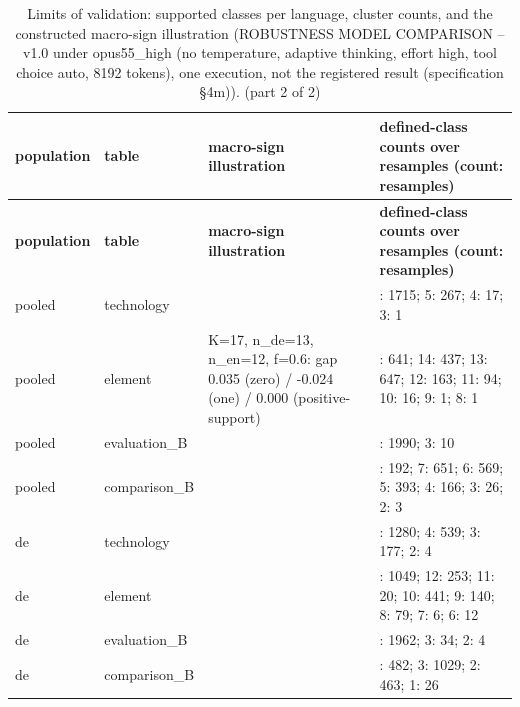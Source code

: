 \begingroup\footnotesize
\begin{longtable}{>{\raggedright\arraybackslash}p{67.2pt}>{\raggedright\arraybackslash}p{61.3pt}>{\raggedright\arraybackslash}p{153.8pt}>{\raggedright\arraybackslash}p{124.7pt}}
\caption{Limits of validation:\allowbreak{} supported classes per language, cluster counts, and the constructed macro-sign illustration (ROBUSTNESS MODEL COMPARISON -- v1.0 under opus55\_\allowbreak{}high (no temperature, adaptive thinking, effort high, tool choice auto, 8192 tokens), one execution, not the registered result (specification §4m)). (part 2 of 2)} \\
\toprule
\textbf{population} & \textbf{table} & \textbf{macro-sign illustration} & \textbf{defined-class counts over resamples (count:\allowbreak{} resamples)} \\
\midrule
\endfirsthead
\toprule
\textbf{population} & \textbf{table} & \textbf{macro-sign illustration} & \textbf{defined-class counts over resamples (count:\allowbreak{} resamples)} \\
\midrule
\endhead
\bottomrule
\endfoot
pooled & technology &  & 6:\allowbreak{} 1715; 5:\allowbreak{} 267; 4:\allowbreak{} 17; 3:\allowbreak{} 1 \\
pooled & element & K=\allowbreak{}17, n\_\allowbreak{}de=\allowbreak{}13, n\_\allowbreak{}en=\allowbreak{}12, f=\allowbreak{}0.6:\allowbreak{} gap 0.035 (zero) / -0.024 (one) / 0.000 (positive-support) & 15:\allowbreak{} 641; 14:\allowbreak{} 437; 13:\allowbreak{} 647; 12:\allowbreak{} 163; 11:\allowbreak{} 94; 10:\allowbreak{} 16; 9:\allowbreak{} 1; 8:\allowbreak{} 1 \\
pooled & evaluation\_\allowbreak{}B &  & 4:\allowbreak{} 1990; 3:\allowbreak{} 10 \\
pooled & comparison\_\allowbreak{}B &  & 8:\allowbreak{} 192; 7:\allowbreak{} 651; 6:\allowbreak{} 569; 5:\allowbreak{} 393; 4:\allowbreak{} 166; 3:\allowbreak{} 26; 2:\allowbreak{} 3 \\
de & technology &  & 5:\allowbreak{} 1280; 4:\allowbreak{} 539; 3:\allowbreak{} 177; 2:\allowbreak{} 4 \\
de & element &  & 13:\allowbreak{} 1049; 12:\allowbreak{} 253; 11:\allowbreak{} 20; 10:\allowbreak{} 441; 9:\allowbreak{} 140; 8:\allowbreak{} 79; 7:\allowbreak{} 6; 6:\allowbreak{} 12 \\
de & evaluation\_\allowbreak{}B &  & 4:\allowbreak{} 1962; 3:\allowbreak{} 34; 2:\allowbreak{} 4 \\
de & comparison\_\allowbreak{}B &  & 4:\allowbreak{} 482; 3:\allowbreak{} 1029; 2:\allowbreak{} 463; 1:\allowbreak{} 26 \\

\end{longtable}

